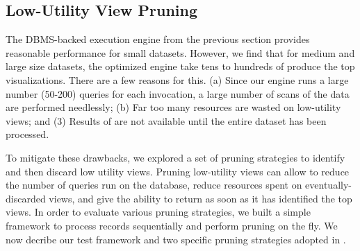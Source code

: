 

\subsection{Low-Utility View Pruning}
\label{sec:in_memory_execution_engine}
The DBMS-backed execution engine from the previous section provides reasonable performance for small datasets.
However, we find that for medium and large size datasets, the optimized engine take tens to hundreds of produce the top visualizations.
There are a few reasons for this. (a) Since our engine runs a large number (50-200) queries for each \SeeDB invocation, a large number of scans of the data are performed needlessly; (b) Far too many resources are wasted on low-utility views; and (3) Results of \SeeDB are not available until the entire dataset has been processed.

To mitigate these drawbacks, we explored a set of pruning strategies to identify and then discard low utility views.
Pruning low-utility views can allow \SeeDB to reduce the number of queries run on the database, reduce resources spent on eventually-discarded views, and give \SeeDB the ability to return as soon as it has identified the top views.
In order to evaluate various pruning strategies, we built a simple framework to process records sequentially and perform pruning on the fly.
We now decribe our test framework and two specific pruning strategies adopted in \SeeDB.


